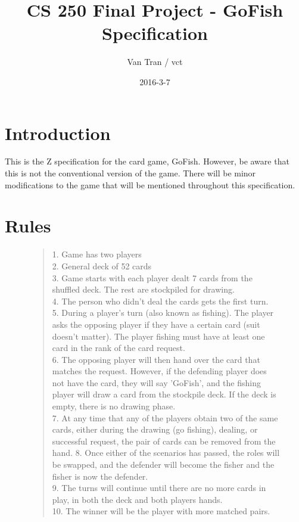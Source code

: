 \documentclass{article}
\title{CS 250 Final Project - GoFish Specification}
\author{Van Tran / vct}
\date{2016-3-7}
\begin{document}
\maketitle

\section*{Introduction}
This is the Z specification for the card game, GoFish.
However, be aware that this is not the conventional version
of the game. There will be minor modifications to the game
that will be mentioned throughout this specification.

\section*{Rules}
\begin{figure}[h]
\begin{quotation}
1. Game has two players \\
2. General deck of 52 cards\\
3. Game starts with each player dealt 7 cards from the
shuffled deck. The rest are stockpiled for drawing. \\
4. The person who didn't deal the cards gets the first turn. \\
5. During a player's turn (also known as fishing). The player
asks the opposing player if they have a certain card (suit doesn't matter).
The player fishing must have at least one card in the rank of the card request.\\
6. The opposing player will then hand over the card that matches
the request. However, if the defending player does not have the card,
they will say 'GoFish', and the fishing player will draw a card
from the stockpile deck. If the deck is empty, there is no drawing phase.\\
7. At any time that any of the players obtain two of the same cards,
either during the drawing (go fishing), dealing, or successful request,
the pair of cards can be removed from the hand.
8. Once either of the scenarios has passed, the roles will be swapped,
and the defender will become the fisher and the fisher is now the defender.\\
9. The turns will continue until there are no more cards in play, in both
the deck and both players hands.\\
10. The winner will be the player with more matched pairs. \\
\end{quotation}
\end{figure}
\end{document}
